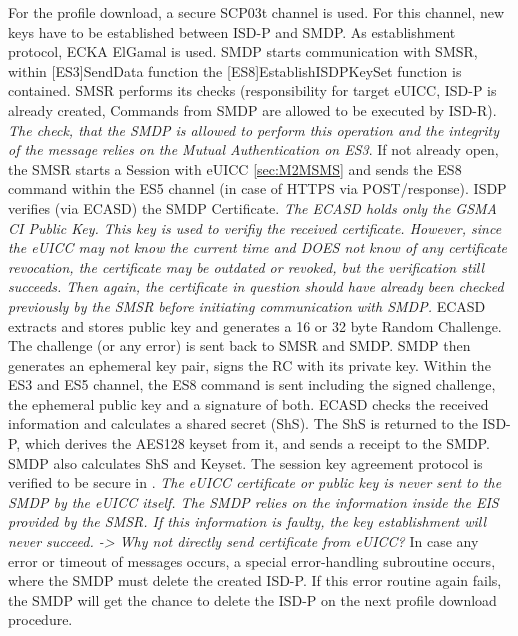 For the profile download, a secure SCP03t channel is used. For this channel, new keys have to be established between ISD-P and SMDP. As establishment protocol, ECKA ElGamal is used. SMDP starts communication with SMSR, within [ES3]SendData function the [ES8]EstablishISDPKeySet function is contained. SMSR performs its checks (responsibility for target eUICC, ISD-P is already created, Commands from SMDP are allowed to be executed by ISD-R). \textit{The check, that the SMDP is allowed to perform this operation and the integrity of the message relies on the Mutual Authentication on ES3}. If not already open, the SMSR starts a Session with eUICC \ref{sec:M2MSMS} and sends the ES8 command within the ES5 channel (in case of HTTPS via POST/response). ISDP verifies (via ECASD) the SMDP Certificate. \textit{The ECASD holds only the GSMA CI Public Key. This key is used to verifiy the received certificate. However, since the eUICC may not know the current time and DOES not know of any certificate revocation, the certificate may be outdated or revoked, but the verification still succeeds. Then again, the certificate in question should have already been checked previously by the SMSR before initiating communication with SMDP.} 
ECASD extracts and stores public key and generates a 16 or 32 byte Random Challenge. The challenge (or any error) is sent back to SMSR and SMDP. SMDP then generates an ephemeral key pair, signs the RC with its private key. Within the ES3 and ES5 channel, the ES8 command is sent including the signed challenge, the ephemeral public key and a signature of both. ECASD checks the received information and calculates a shared secret (ShS). The ShS is returned to the ISD-P, which derives the AES128 keyset from it, and sends a receipt to the SMDP. SMDP also calculates ShS and Keyset. The session key agreement protocol is verified to be secure in \parencite{Ding:FormAnalSessionKey}. \textit{The eUICC certificate or public key is never sent to the SMDP by the eUICC itself. The SMDP relies on the information inside the EIS provided by the SMSR. If this information is faulty, the key establishment will never succeed. -> Why not directly send certificate from eUICC?} 
In case any error or timeout of messages occurs, a special error-handling subroutine occurs, where the SMDP must delete the created ISD-P. If this error routine again fails, the SMDP will get the chance to delete the ISD-P on the next profile download procedure.

